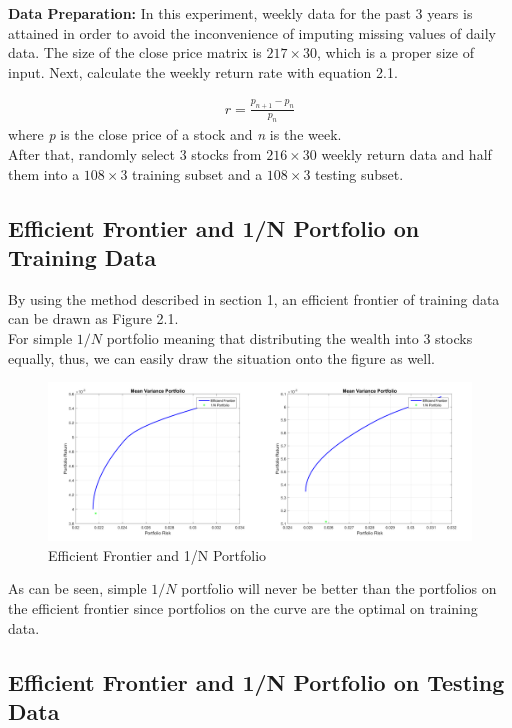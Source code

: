 \documentclass[paper=a4, fontsize=11pt]{article} %
\numberwithin{equation}{section} %
\numberwithin{figure}{section} %
\numberwithin{table}{section} %
\begin{document}
\textbf{Data Preparation:} In this experiment, weekly data for the past 3 years is attained in order to avoid the inconvenience of imputing missing values of daily data. The size of the close price matrix is $217 \times 30$, which is a proper size of input. Next, calculate the weekly return rate with equation 2.1. 

\begin{align}
r=\frac{p_{n+1} - p_{n}}{p_{n}}
\end{align}
where \textit{p} is the close price of a stock and \textit{n} is the week. \\
After that, randomly select 3 stocks from $216 \times 30$ weekly return data and half them into a $108 \times 3 $ training subset and a $108 \times 3 $ testing subset. 

\subsection{Efficient Frontier and 1/N Portfolio on Training Data}
By using the method described in section 1, an efficient frontier of training data can be drawn as Figure 2.1. \\
For simple $1/N$ portfolio meaning that distributing the wealth into 3 stocks equally, thus, we can easily draw the situation onto the figure as well.

\newpage
\begin{figure}[h!]
	\centering
	\includegraphics[width=18cm]{fig3_1.png}
	\caption{Efficient Frontier and 1/N Portfolio}
\end{figure}

As can be seen, simple $1/N$ portfolio will never be better than the portfolios on the efficient frontier since portfolios on the curve are the optimal on training data.

\subsection{Efficient Frontier and 1/N Portfolio on Testing Data}
\end{document}
